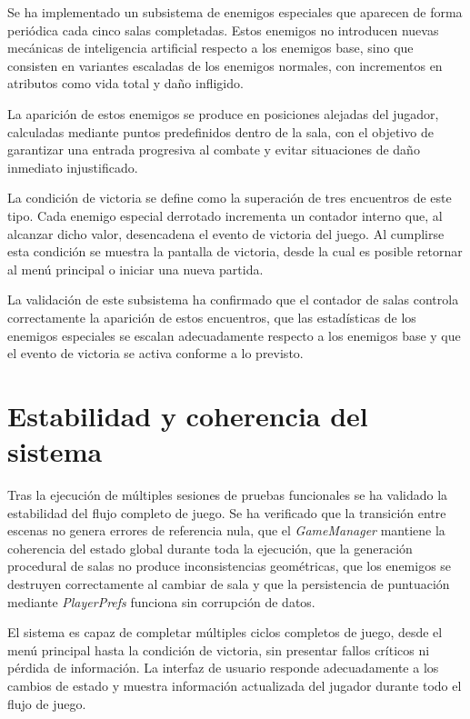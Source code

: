 Se ha implementado un subsistema de enemigos especiales que aparecen de forma periódica cada cinco salas completadas. Estos enemigos no introducen nuevas mecánicas de inteligencia artificial respecto a los enemigos base, sino que consisten en variantes escaladas de los enemigos normales, con incrementos en atributos como vida total y daño infligido.

La aparición de estos enemigos se produce en posiciones alejadas del jugador, calculadas mediante puntos predefinidos dentro de la sala, con el objetivo de garantizar una entrada progresiva al combate y evitar situaciones de daño inmediato injustificado.

La condición de victoria se define como la superación de tres encuentros de este tipo. Cada enemigo especial derrotado incrementa un contador interno que, al alcanzar dicho valor, desencadena el evento de victoria del juego. Al cumplirse esta condición se muestra la pantalla de victoria, desde la cual es posible retornar al menú principal o iniciar una nueva partida.

La validación de este subsistema ha confirmado que el contador de salas controla correctamente la aparición de estos encuentros, que las estadísticas de los enemigos especiales se escalan adecuadamente respecto a los enemigos base y que el evento de victoria se activa conforme a lo previsto.

\section{Estabilidad y coherencia del sistema}

Tras la ejecución de múltiples sesiones de pruebas funcionales se ha validado la estabilidad del flujo completo de juego. Se ha verificado que la transición entre escenas no genera errores de referencia nula, que el \textit{GameManager} mantiene la coherencia del estado global durante toda la ejecución, que la generación procedural de salas no produce inconsistencias geométricas, que los enemigos se destruyen correctamente al cambiar de sala y que la persistencia de puntuación mediante \textit{PlayerPrefs} funciona sin corrupción de datos.

El sistema es capaz de completar múltiples ciclos completos de juego, desde el menú principal hasta la condición de victoria, sin presentar fallos críticos ni pérdida de información. La interfaz de usuario responde adecuadamente a los cambios de estado y muestra información actualizada del jugador durante todo el flujo de juego.

